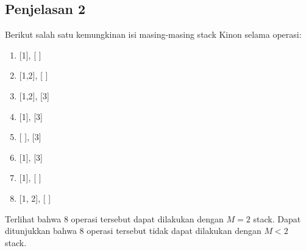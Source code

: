 \documentclass{article}
\begin{document}
\subsection*{Penjelasan 2}
Berikut salah satu kemungkinan isi masing-masing stack Kinon selama operasi:

\begin{enumerate}

\item{[1], [ ]}
\item{[1,2], [ ]}
\item{[1,2], [3]}
\item{[1], [3]}
\item{[ ], [3]}
\item{[1], [3]}
\item{[1], [ ]}
\item{[1, 2], [ ]}

\end{enumerate}

Terlihat bahwa 8 operasi tersebut dapat dilakukan dengan $M=2$ stack. Dapat ditunjukkan bahwa 8 operasi tersebut tidak dapat dilakukan dengan $M<2$ stack.
\end{document}

